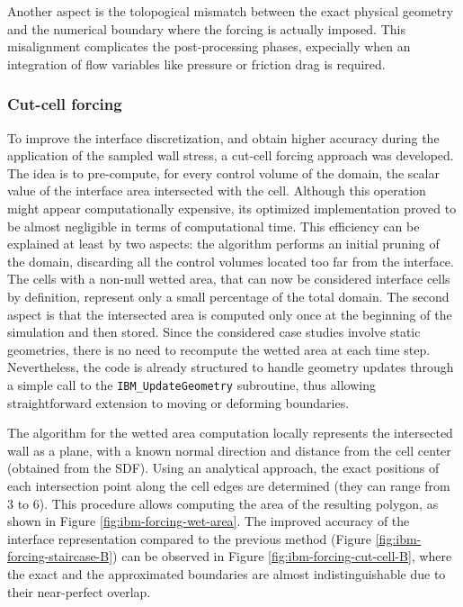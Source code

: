 \documentclass[12pt, a4paper, twoside, openright]{book}
\begin{document}
Another aspect is the tolopogical mismatch between the exact physical geometry and the numerical boundary where the forcing is actually imposed. This misalignment complicates the post-processing phases, expecially when an integration of flow variables like pressure or friction drag is required.

\subsubsection{Cut-cell forcing}
\label{sec:cut-cell-forcing}
To improve the interface discretization, and obtain higher accuracy during the application of the sampled wall stress, a cut-cell forcing approach was developed. The idea is to pre-compute, for every control volume of the domain, the scalar value of the interface area intersected with the cell. Although this operation might appear computationally expensive, its optimized implementation proved to be almost negligible in terms of computational time. This efficiency can be explained at least by two aspects: the algorithm performs an initial pruning of the domain, discarding all the control volumes located too far from the interface. The cells with a non-null wetted area, that can now be considered interface cells by definition, represent only a small percentage of the total domain. The second aspect is that the intersected area is computed only once at the beginning of the simulation and then stored. Since the considered case studies involve static geometries, there is no need to recompute the wetted area at each time step. Nevertheless, the code is already structured to handle geometry updates through a simple call to the \texttt{IBM\_UpdateGeometry} subroutine, thus allowing straightforward extension to moving or deforming boundaries.

The algorithm for the wetted area computation locally represents the intersected wall as a plane, with a known normal direction and distance from the cell center (obtained from the SDF). Using an analytical approach, the exact positions of each intersection point along the cell edges are determined (they can range from 3 to 6). This procedure allows computing the area of the resulting polygon, as shown in Figure \ref{fig:ibm-forcing-wet-area}. The improved accuracy of the interface representation compared to the previous method (Figure \ref{fig:ibm-forcing-staircase-B}) can be observed in Figure \ref{fig:ibm-forcing-cut-cell-B}, where the exact and the approximated boundaries are almost indistinguishable due to their near-perfect overlap.
\end{document}

